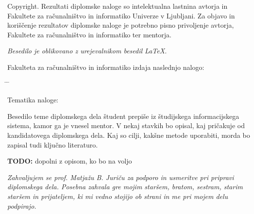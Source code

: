 \documentclass[a4paper, 12pt]{book}
\newcommand{\clearemptydoublepage}{\newpage{\pagestyle{empty}\cleardoublepage}}
\begin{document}
\noindent
{\sc Copyright}. 
Rezultati diplomske naloge so intelektualna lastnina avtorja in Fakultete za računalništvo in informatiko Univerze v Ljubljani.
Za objavo in koriščenje rezultatov diplomske naloge je potrebno pisno privoljenje avtorja, Fakultete za računalništvo in informatiko ter mentorja.

\begin{center}
\mbox{}\vfill
\emph{Besedilo je oblikovano z urejevalnikom besedil \LaTeX.}
\end{center}
\clearemptydoublepage

\thispagestyle{empty}
\vspace*{4cm}

\noindent
Fakulteta za računalništvo in informatiko izdaja naslednjo nalogo:
\medskip
\begin{tabbing}
\hspace{32mm}\= \hspace{6cm} \= \kill




Tematika naloge:
\end{tabbing}
Besedilo teme diplomskega dela študent prepiše iz študijskega informacijskega sistema, kamor ga je vnesel mentor. V nekaj stavkih bo opisal, kaj pričakuje od kandidatovega diplomskega dela. Kaj so cilji, kakšne metode uporabiti, morda bo zapisal tudi ključno literaturo.

\textbf{TODO:} dopolni z opisom, ko bo na voljo
\vspace{15mm}



\vspace{2cm}

\clearemptydoublepage

\thispagestyle{empty}\mbox{}\vfill\null\it%
\noindent
Zahvaljujem se prof. Matjažu B. Juriču za podporo in usmeritve pri pripravi diplomskega dela. Posebna zahvala gre mojim staršem, bratom, sestram, starim staršem in prijateljem, ki mi vedno stojijo ob strani in me pri mojem delu podpirajo.
\rm\normalfont

\clearemptydoublepage

\end{document}
